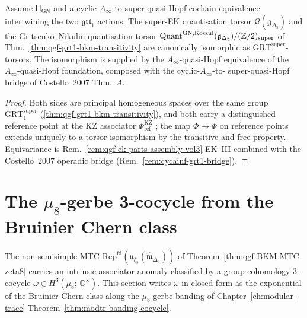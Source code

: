 \begin{corollary}
\label{cor:qgf-vol1-vol3-torsor-compat}
Assume $\mathsf H_{\mathrm{GN}}$ and a cyclic-$A_\infty$-to-super-quasi-Hopf
cochain equivalence intertwining the two $\mathfrak{grt}_1$ actions.
The super-EK quantisation torsor
$\mathcal Q(\mathfrak g_{\Delta_5})$ and the
Gritsenko--Nikulin quantisation torsor
$\mathrm{Quant}^{\mathrm{GN, Koszul}}(\mathfrak g_{\Delta_5})/
(\mathbb Z/2)_{\mathrm{super}}$ of
Thm.~\ref{thm:qgf-grt1-bkm-transitivity} are canonically isomorphic
as $\mathrm{GRT}_1^{\mathrm{super}}$-torsors. The isomorphism is
supplied by the $A_\infty$-quasi-Hopf equivalence of
the $A_\infty$-quasi-Hopf foundation, composed with the cyclic-$A_\infty$-to-
super-quasi-Hopf bridge of Costello~$2007$ Thm.~$A$.
\end{corollary}

\begin{proof}
Both sides are principal homogeneous spaces over the same group
$\mathrm{GRT}_1^{\mathrm{super}}$
(\ref{thm:qgf-grt1-bkm-transitivity}), and both
carry a distinguished reference point at the KZ associator
$\Phi^{\mathrm{KZ}}_{\mathrm{ref}}$
; the map
$\Phi \mapsto \Phi$ on reference points extends uniquely to a
torsor isomorphism by the transitive-and-free property. Equivariance
is Rem.~\ref{rem:qgf-ek-parts-assembly-vol3} EK~III combined with
the Costello~$2007$ operadic bridge
(Rem.~\ref{rem:cycainf-grt1-bridge}).
\end{proof}

\section{The \texorpdfstring{$\mu_8$}{mu-8}-gerbe 3-cocycle from the Bruinier Chern class}
\label{sec:qgf-mu8-gerbe-3-cocycle}

The non-semisimple MTC $\mathrm{Rep}^{\mathrm{fd}}(\mathfrak u_{\zeta_8}
(\widehat{\mathfrak m}_{\Delta_5}))$ of
Theorem~\ref{thm:qgf-BKM-MTC-zeta8} carries an intrinsic associator
anomaly classified by a group-cohomology $3$-cocycle
$\omega\in H^3(\mu_8;\,\mathbb C^\times)$. This section writes $\omega$
in closed form as the exponential of the Bruinier Chern class along the
$\mu_8$-gerbe banding of
Chapter~\ref{ch:modular-trace} Theorem~\ref{thm:modtr-banding-cocycle}.

